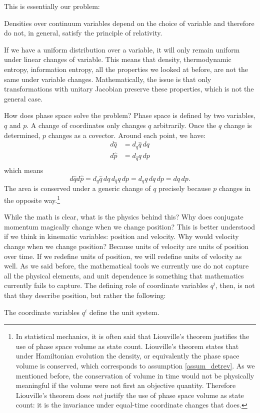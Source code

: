 This is essentially our problem:
\begin{insight}
	Densities over continuum variables depend on the choice of variable and therefore do not, in general, satisfy the principle of relativity.
\end{insight}
If we have a uniform distribution over a variable, it will only remain uniform under linear changes of variable. This means that density, thermodynamic entropy, information entropy, all the properties we looked at before, are not the same under variable changes. Mathematically, the issue is that only transformations with unitary Jacobian preserve these properties, which is not the general case.

How does phase space solve the problem? Phase space is defined by two variables, $q$ and $p$. A change of coordinates only changes $q$ arbitrarily. Once the $q$ change is determined, $p$ changes as a covector. Around each point, we have:
\begin{equation}
	\begin{aligned}
		d \hat{q} &= d_q \hat{q} \, dq \\
		d \hat{p} &= d_{\hat{q}} q \, dp \\
	\end{aligned}
\end{equation}
which means
\begin{equation}
	d \hat{q} d \hat{p} = d_q \hat{q} \, dq \, d_{\hat{q}} q \, dp = d_q q \, dq \, dp = dq \, dp.
\end{equation}
The area is conserved under a generic change of $q$ precisely because $p$ changes in the opposite way.\footnote{In statistical mechanics, it is often said that Liouville's theorem justifies the use of phase space volume as state count. Liouville's theorem states that under Hamiltonian evolution the density, or equivalently the phase space volume is conserved, which corresponds to assumption \ref{assum_detrev}. As we mentioned before, the conservation of volume in time would not be physically meaningful if the volume were not first an objective quantity. Therefore Liouville's theorem does \emph{not} justify the use of phase space volume as state count: it is the invariance under equal-time coordinate changes that does. }

While the math is clear, what is the physics behind this? Why does conjugate momentum magically change when we change position? This is better understood if we think in kinematic variables: position and velocity. Why would velocity change when we change position? Because units of velocity are units of position over time. If we redefine units of position, we will redefine units of velocity as well. As we said before, the mathematical tools we currently use do not capture all the physical elements, and unit dependence is something that mathematics currently fails to capture. The defining role of coordinate variables $q^i$, then, is not that they describe position, but rather the following:
\begin{insight}
	The coordinate variables $q^i$ define the unit system.
\end{insight}

